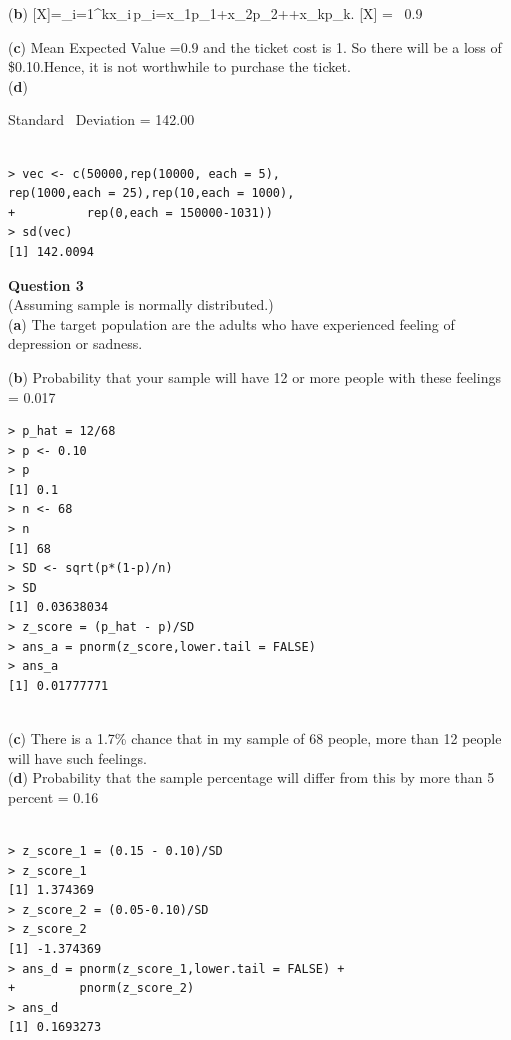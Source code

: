 \documentclass[12pt,letterpaper]{article}
\begin{document}
{(\textbf{b})} 
{\displaystyle {} [X]=\sum _{i=1}^{k}x_{i}\,p_{i}=x_{1}p_{1}+x_{2}p_{2}+\cdots +x_{k}p_{k}.}
{\displaystyle {} [X] =  \ 0.9}

{(\textbf{c})} Mean Expected Value =$0.9$ and the ticket cost is 1. So there will be a loss of  \$0.10.Hence, it is not worthwhile to purchase the ticket.\\

{(\textbf{d})} 

Standard \ Deviation = 	142.00
\begin{lstlisting}[label=R Code,caption=Q4(a) R Code Output]
      
> vec <- c(50000,rep(10000, each = 5),
rep(1000,each = 25),rep(10,each = 1000),
+          rep(0,each = 150000-1031))
> sd(vec)
[1] 142.0094
\end{lstlisting}
{\Large \textbf{Question 3}}\\
(Assuming sample is normally distributed.)\\

{(\textbf{a})} The target population are the  adults who have experienced feeling of depression or sadness.

{(\textbf{b})} Probability that your sample will have 12 or more people
with these feelings = 0.017
\begin{lstlisting}[label=R Code,caption=Q3(b) R Code Output]
> p_hat = 12/68
> p <- 0.10
> p
[1] 0.1
> n <- 68
> n
[1] 68
> SD <- sqrt(p*(1-p)/n)
> SD
[1] 0.03638034
> z_score = (p_hat - p)/SD
> ans_a = pnorm(z_score,lower.tail = FALSE)
> ans_a
[1] 0.01777771
          
\end{lstlisting}

{(\textbf{c})} There is a 1.7\% chance that in my sample of 68 people, more than 12 people will have such feelings. \\

{(\textbf{d})} Probability that the sample percentage will differ from this by more than 5 percent  = 0.16\\

\begin{lstlisting}[label=R Code,caption=Q3(d) R Code Output]
      
> z_score_1 = (0.15 - 0.10)/SD
> z_score_1
[1] 1.374369
> z_score_2 = (0.05-0.10)/SD
> z_score_2
[1] -1.374369
> ans_d = pnorm(z_score_1,lower.tail = FALSE) + 
+         pnorm(z_score_2)
> ans_d
[1] 0.1693273
          
\end{lstlisting}
\end{document}

